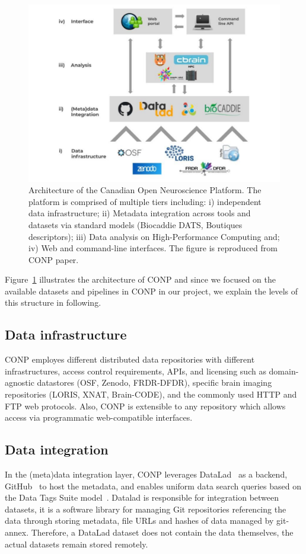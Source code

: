 \begin{figure}
    \centering
    \includegraphics[width=\textwidth]{figures/CONP_figure.pdf}
    \caption{Architecture of the Canadian Open Neuroscience Platform. The platform is comprised of multiple tiers including:  i) independent data infrastructure; ii) Metadata integration across tools and datasets via standard models (Biocaddie DATS, Boutiques descriptors); iii) Data analysis on High-Performance Computing and; iv) Web and command-line interfaces. The figure is reproduced from CONP paper.}
    \label{fig:CONP_figure}
\end{figure}

Figure~\ref{fig:CONP_figure} illustrates the architecture of CONP and since we focused on the available datasets and pipelines in CONP in our project, we explain the levels of this structure in following. 

\subsection{Data infrastructure}
CONP employes different distributed data repositories with different infrastructures, access control requirements, APIs, and licensing such as domain-agnostic datastores (OSF, Zenodo, FRDR-DFDR), specific brain imaging repositories (LORIS, XNAT, Brain-CODE), and the commonly used HTTP and FTP web protocols. Also, CONP is extensible to any repository which allows access via programmatic web-compatible interfaces.

\subsection{Data integration}
In the (meta)data integration layer, CONP leverages DataLad~\cite{} as a backend, GitHub~\cite{} to host the metadata, and enables uniform data search queries based on the Data Tags Suite model~\cite{}. Datalad is responsible for integration between datasets, it is a software library for managing Git repositories referencing the data through storing metadata, file URLs and hashes of data managed by git-annex. Therefore, a DataLad dataset does not contain the data themselves, the actual datasets remain stored remotely.

